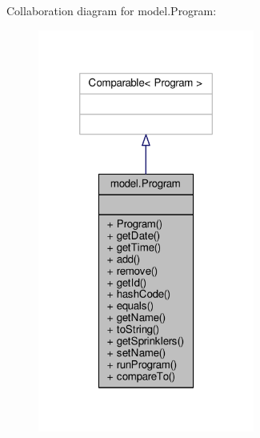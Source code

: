 Collaboration diagram for model.\-Program\-:\nopagebreak
\begin{figure}[H]
\begin{center}
\leavevmode
\includegraphics[width=202pt]{classmodel_1_1Program__coll__graph}
\end{center}
\end{figure}
